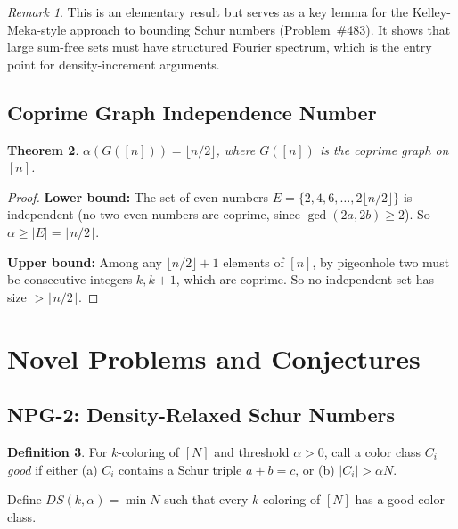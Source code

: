 \documentclass[11pt,a4paper]{article}
\newtheorem{theorem}{Theorem}[section]
\theoremstyle{definition}
\newtheorem{definition}[theorem]{Definition}
\theoremstyle{remark}
\newtheorem{remark}[theorem]{Remark}
\begin{document}
\begin{remark}
This is an elementary result but serves as a key lemma for the Kelley-Meka-style
approach to bounding Schur numbers (Problem~\#483). It shows that large sum-free
sets must have structured Fourier spectrum, which is the entry point for
density-increment arguments.
\end{remark}

\subsection{Coprime Graph Independence Number}

\begin{theorem}\label{thm:coprime-indep}
$\alpha(G([n])) = \lfloor n/2 \rfloor$, where $G([n])$ is the coprime graph
on $[n]$.
\end{theorem}

\begin{proof}
\textbf{Lower bound:} The set of even numbers $E = \{2,4,6,\ldots,2\lfloor n/2\rfloor\}$
is independent (no two even numbers are coprime, since $\gcd(2a,2b) \geq 2$).
So $\alpha \geq |E| = \lfloor n/2 \rfloor$.

\textbf{Upper bound:} Among any $\lfloor n/2 \rfloor + 1$ elements of $[n]$,
by pigeonhole two must be consecutive integers $k, k+1$, which are coprime.
So no independent set has size $> \lfloor n/2 \rfloor$.
\end{proof}

\section{Novel Problems and Conjectures}

\subsection{NPG-2: Density-Relaxed Schur Numbers}

\begin{definition}
For $k$-coloring of $[N]$ and threshold $\alpha > 0$, call a color class
$C_i$ \emph{good} if either (a) $C_i$ contains a Schur triple $a+b=c$,
or (b) $|C_i| > \alpha N$.

Define $DS(k,\alpha) = \min N$ such that every $k$-coloring of $[N]$
has a good color class.
\end{definition}
\end{document}

